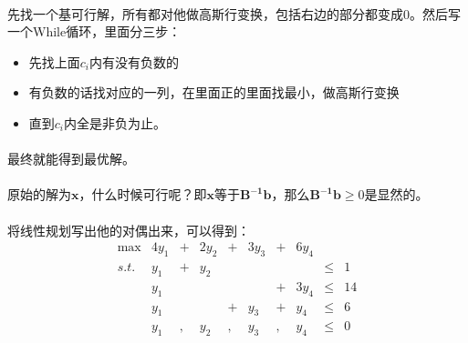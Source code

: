 		\paragraph{}先找一个基可行解，所有都对他做高斯行变换，包括右边的部分都变成0。然后写一个While循环，里面分三步：
		\begin{itemize}
			\item 先找上面$c_i$内有没有负数的
			\item 有负数的话找对应的一列，在里面正的里面找最小，做高斯行变换
			\item 直到$c_i$内全是非负为止。
		\end{itemize}
		\paragraph{}最终就能得到最优解。
		\paragraph{}原始的解为$\mathbf{x}$，什么时候可行呢？即$\mathbf{x}$等于$\mathbf{B^{-1} b}$，那么$\mathbf{B^{-1} b} \geq 0$是显然的。
		\paragraph{}将线性规划写出他的对偶出来，可以得到：
			\[
			\begin{array}{rrrrrrrrrrrrl}
 				\max &  4y_1 &+&   2y_2    &+& 3y_3 &+& 6y_4&      &\\
 				s.t.    &   y_1  &+&     y_2    & &           &   &             &\leq & 1   \\
         				&   y_1  &   &               &  &          &+&  3y_4   & \leq & 14   \\
         				&   y_1   & &                &+&  y_3  &+& y_4      & \leq & 6   \\
          				&   y_1  &,&   y_2       &,&  y_3   &,&  y_4      & \leq & 0   
			\end{array} \nonumber
			\]

